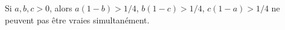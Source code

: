Si $a, b, c > 0$, alors $a(1 - b) > 1/4$, $b(1 - c) > 1/4$, $c(1 - a) > 1/4$ ne peuvent pas être vraies simultanément.
